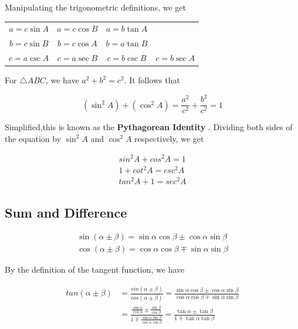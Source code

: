         \noindent Manipulating the trigonometric definitions, we get

        \begin{center}
            \begin{tabular}{cccc}
                $a=c\sin A$
                & $a=c\cos B$
                & $a = b\tan A$ & \\
                $b=c\sin B$
                & $b=c\cos A$
                & $b=a\tan B$ & \\
                $c=a\csc A$
                & $c=a\sec B$
                & $c=b\csc B$
                & $c=b\sec A$
            \end{tabular}
        \end{center}

        \noindent For $\triangle ABC$, we have $a^2+b^2=c^2$. It follows that

        \begin{equation*}
            (\sin ^2 A) + (\cos ^2 A) = \frac{a^2}{c^2} + \frac{b^2}{c^2}=1
        \end{equation*}

        \noindent Simplified,this is known as the \color{purple} \textbf{Pythagorean Identity}
        \color{black}. Dividing both sides of the equation by $\sin ^2 A$ and $\cos ^2 A$
        respectively, we get

        \begin{align*}
            sin^2 A + cos^2 A = 1 \\
            1 + cot^2 A = csc^2 A \\
            tan^2 A + 1 = sec^2 A
        \end{align*}



    \subsection{Sum and Difference}
        \begin{align*}
            \sin (\alpha \pm \beta) = \sin \alpha \cos \beta \pm \cos \alpha \sin \beta \\
            \cos (\alpha \pm \beta) = \cos \alpha \cos \beta \mp \sin \alpha \sin \beta
        \end{align*}

        \noindent By the definition of the tangent function, we have

        \begin{align*}
            tan(\alpha \pm \beta) &= \frac{sin(\alpha \pm \beta)}{cos(\alpha \pm \beta)}
            = \frac{\sin \alpha \cos \beta \pm \cos \alpha \sin \beta}{\cos \alpha \cos \beta \mp \sin \alpha \sin \beta} \\
            &= \frac{\frac{\sin\alpha}{\cos\alpha}\pm\frac{\sin\beta}{\cos\beta}}{1\mp\frac{\sin\alpha\sin\beta}{\cos\alpha\cos\beta}}
            = \frac{\tan\alpha \pm \tan\beta}{1 \mp \tan\alpha\tan\beta}
        \end{align*}



